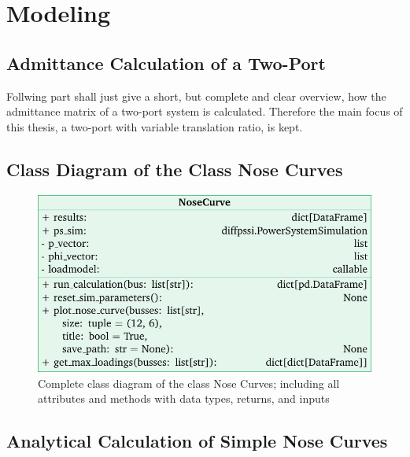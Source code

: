\chapter{Modeling}

\section{Admittance Calculation of a Two-Port}
\label{app:admittance-deduction}

Follwing part shall just give a short, but complete and clear overview, how the admittance matrix of a two-port system is calculated.
Therefore the main focus of this thesis, a two-port with variable translation ratio, is kept.

\section{Class Diagram of the Class Nose Curves}
\label{app:nose-curve}

\begin{figure}[H]
    \centering
    \includegraphics[width=12cm]{tikz_graphics/images/class_diagram_nosecurve_complete.pdf}
    \caption{Complete class diagram of the class Nose Curves; including all attributes and methods with data types, returns, and inputs}
    \label{fig:class-diagram-nose-curves}
\end{figure}

\section{Analytical Calculation of Simple Nose Curves}
\label{app:analytical-nose-curve}


